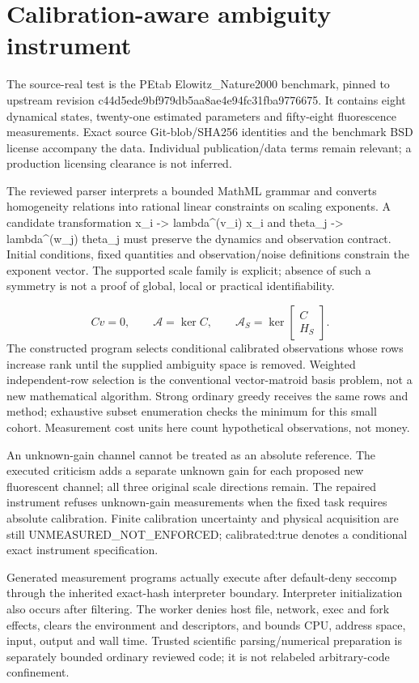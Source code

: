 \documentclass[11pt,letterpaper]{article}
\begin{document}
\section{Calibration-aware ambiguity instrument}
The source-real test is the PEtab Elowitz\_Nature2000 benchmark, pinned to upstream revision c44d5ede9bf979db5aa8ae4e94fc31fba9776675. It contains eight dynamical states, twenty-one estimated parameters and fifty-eight fluorescence measurements. Exact source Git-blob/SHA256 identities and the benchmark BSD license accompany the data. Individual publication/data terms remain relevant; a production licensing clearance is not inferred.\par
The reviewed parser interprets a bounded MathML grammar and converts homogeneity relations into rational linear constraints on scaling exponents. A candidate transformation x\_i -> lambda\textasciicircum{}(v\_i) x\_i and theta\_j -> lambda\textasciicircum{}(w\_j) theta\_j must preserve the dynamics and observation contract. Initial conditions, fixed quantities and observation/noise definitions constrain the exponent vector. The supported scale family is explicit; absence of such a symmetry is not a proof of global, local or practical identifiability.\par
\[Cv=0,\qquad \mathcal{A}=\ker C,\qquad \mathcal{A}_{S}=\ker \begin{bmatrix}C\\H_{S}\end{bmatrix}.\]
The constructed program selects conditional calibrated observations whose rows increase rank until the supplied ambiguity space is removed. Weighted independent-row selection is the conventional vector-matroid basis problem, not a new mathematical algorithm. Strong ordinary greedy receives the same rows and method; exhaustive subset enumeration checks the minimum for this small cohort. Measurement cost units here count hypothetical observations, not money.\par
An unknown-gain channel cannot be treated as an absolute reference. The executed criticism adds a separate unknown gain for each proposed new fluorescent channel; all three original scale directions remain. The repaired instrument refuses unknown-gain measurements when the fixed task requires absolute calibration. Finite calibration uncertainty and physical acquisition are still UNMEASURED\_NOT\_ENFORCED; calibrated:true denotes a conditional exact instrument specification.\par
Generated measurement programs actually execute after default-deny seccomp through the inherited exact-hash interpreter boundary. Interpreter initialization also occurs after filtering. The worker denies host file, network, exec and fork effects, clears the environment and descriptors, and bounds CPU, address space, input, output and wall time. Trusted scientific parsing/numerical preparation is separately bounded ordinary reviewed code; it is not relabeled arbitrary-code confinement.\par
\end{document}
